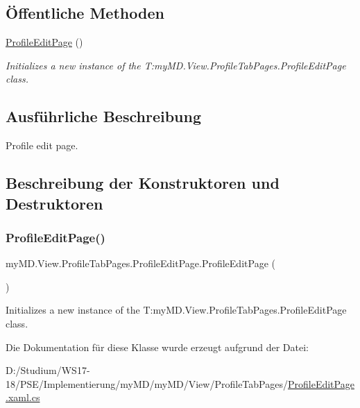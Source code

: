 \subsection*{Öffentliche Methoden}
\begin{DoxyCompactItemize}
\item 
\mbox{\hyperlink{classmy_m_d_1_1_view_1_1_profile_tab_pages_1_1_profile_edit_page_a57cda13445f900fc10f7f1fcac4eac86}{Profile\+Edit\+Page}} ()
\begin{DoxyCompactList}\small\item\em Initializes a new instance of the T\+:my\+M\+D.\+View.\+Profile\+Tab\+Pages.\+Profile\+Edit\+Page class. \end{DoxyCompactList}\end{DoxyCompactItemize}


\subsection{Ausführliche Beschreibung}
Profile edit page. 



\subsection{Beschreibung der Konstruktoren und Destruktoren}
\mbox{\label{classmy_m_d_1_1_view_1_1_profile_tab_pages_1_1_profile_edit_page_a57cda13445f900fc10f7f1fcac4eac86}} 
\subsubsection{\texorpdfstring{Profile\+Edit\+Page()}{ProfileEditPage()}}
{\footnotesize\ttfamily my\+M\+D.\+View.\+Profile\+Tab\+Pages.\+Profile\+Edit\+Page.\+Profile\+Edit\+Page (\begin{DoxyParamCaption}{ }\end{DoxyParamCaption})}



Initializes a new instance of the T\+:my\+M\+D.\+View.\+Profile\+Tab\+Pages.\+Profile\+Edit\+Page class. 



Die Dokumentation für diese Klasse wurde erzeugt aufgrund der Datei\+:\begin{DoxyCompactItemize}
\item 
D\+:/\+Studium/\+W\+S17-\/18/\+P\+S\+E/\+Implementierung/my\+M\+D/my\+M\+D/\+View/\+Profile\+Tab\+Pages/\mbox{\hyperlink{_profile_edit_page_8xaml_8cs}{Profile\+Edit\+Page.\+xaml.\+cs}}\end{DoxyCompactItemize}

